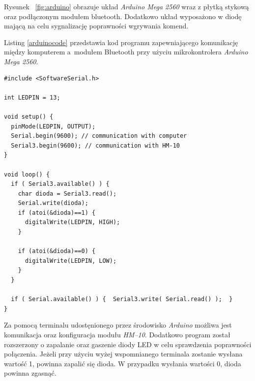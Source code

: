 Rysunek ~\ref{fig:arduino} obrazuje układ \textit{Arduino Mega 2560} wraz z płytką stykową oraz podłączonym modułem bluetooth. Dodatkowo układ wyposażono w diodę mającą na celu sygnalizację poprawności wgrywania komend.

\newpage 

Listing \ref{arduinocode} przedstawia kod programu zapewniającego komunikację między komputerem a~modułem Bluetooth przy użyciu mikrokontrolera \textit{Arduino Mega 2560}. 

\begin{minipage}{\textwidth}
	\begin{lstlisting}[label=arduinocode,caption=Kod programu umożliwiającego konifugrację modułu Bluetooth HM–10.]
#include <SoftwareSerial.h>
 
int LEDPIN = 13;

void setup() {
  pinMode(LEDPIN, OUTPUT);
  Serial.begin(9600); // communication with computer
  Serial3.begin(9600); // communication with HM-10  
}
 
void loop() {
  if ( Serial3.available() ) {
    char dioda = Serial3.read();
    Serial.write(dioda);
    if (atoi(&dioda)==1) {
      digitalWrite(LEDPIN, HIGH);
    }
    
    if (atoi(&dioda)==0) {
      digitalWrite(LEDPIN, LOW);
    }
  }
  
  if ( Serial.available() ) {  Serial3.write( Serial.read() );  }  
}
	\end{lstlisting}
\end{minipage}
 
Za pomocą terminalu udostęnionego przez środowisko \textit{Arduino} możliwa jest komunikacja oraz konfiguracja modułu \textit{HM–10}. Dodatkowo program został rozszerzony o zapalanie oraz gaszenie diody LED w celu sprawdzenia poprawności połączenia. Jeżeli przy użyciu wyżej wspomnianego terminala zostanie wysłana wartość 1, powinna zapalić się dioda. W przypadku wysłania wartości 0, dioda powinna zgasnąć.


 
